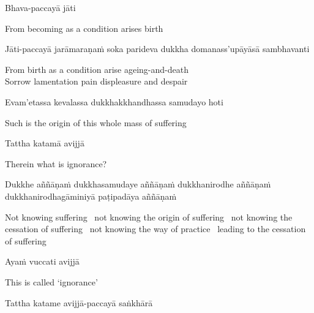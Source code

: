Bhava-paccayā jāti

\begin{english}
  From becoming as a condition arises birth
\end{english}

\begin{pali-hang}
  Jāti-paccayā jarāmaraṇaṁ soka parideva dukkha domanass'upāyāsā sambhavanti
\end{pali-hang}

\begin{english}
  From birth as a condition arise ageing-and-death\\
  Sorrow lamentation pain displeasure and despair
\end{english}

Evam'etassa kevalassa dukkhakkhandhassa samudayo hoti

\begin{english}
  Such is the origin of this whole mass of suffering
\end{english}

Tattha katamā avijjā

\begin{english}
  Therein what is ignorance?
\end{english}

\begin{pali-hang}
  Dukkhe aññāṇaṁ dukkhasamudaye aññāṇaṁ dukkhanirodhe aññāṇaṁ dukkhanirodhagāminiyā paṭipadāya aññāṇaṁ
\end{pali-hang}

\begin{english-hang-verses}
  Not knowing suffering \breathmark\ not knowing the origin of suffering \breathmark\ not knowing the cessation of suffering \breathmark\ not knowing the way of practice \breathmark\ leading to the cessation of suffering
\end{english-hang-verses}

Ayaṁ vuccati avijjā

\begin{english}
  This is called `ignorance'
\end{english}

\begin{pali-hang}
  Tattha katame avijjā-paccayā saṅkhārā
\end{pali-hang}

